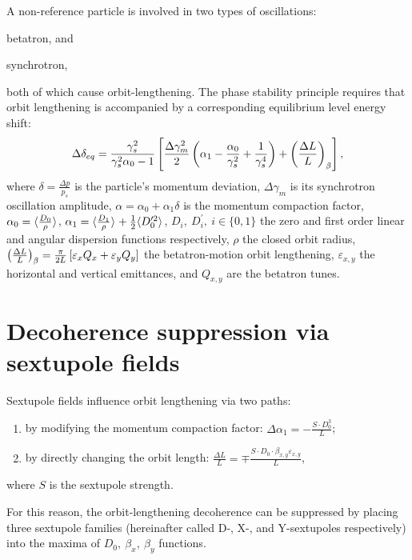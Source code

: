 \documentclass{article}
\begin{document}
A non-reference particle is involved in two types of oscillations:
\begin{inparaenum}[a)]
\item betatron, and
\item synchrotron,
\end{inparaenum}
both of which cause orbit-lengthening. The phase stability principle requires that orbit lengthening is accompanied by a corresponding equilibrium level energy shift:~\cite{Senichev:Decoh}
\begin{equation}
  \Delta\delta_{eq} = \frac{\gamma_s^2}{\gamma_s^2\alpha_0 - 1}\bkt*{\frac{\Delta\gamma_m^2}{2}\bkt{\alpha_1 - \frac{\alpha_0}{\gamma_s^2} + \frac{1}{\gamma_s^4}} + \bkt{\frac{\Delta L}{L}}_\beta},
\end{equation}
where $\delta = \frac{\Delta p}{p_s}$ is the particle's momentum deviation, $\Delta\gamma_m$ is its synchrotron oscillation amplitude, $\alpha = \alpha_0 + \alpha_1\delta$ is the momentum compaction factor, $\alpha_0 = \avg{\frac{D_0}{\rho}}$, $\alpha_1 = \avg{\frac{D_1}{\rho}} + \frac12 \avg{D_0^{\prime2}}$, $D_i,~D_i^\prime,~i\in\{0,1\}$ the zero and first order linear and angular dispersion functions respectively, $\rho$ the closed orbit radius, $\bkt{\frac{\Delta L}{L}}_\beta = \frac{\pi}{2L}\bkt*{\varepsilon_x Q_x + \varepsilon_y Q_y}$ the betatron-motion orbit lengthening, $\varepsilon_{x,y}$ the horizontal and vertical emittances, and $Q_{x,y}$ are the betatron tunes.

\section{Decoherence suppression via sextupole fields}
Sextupole fields influence orbit lengthening via two paths:~\cite{Senichev:Decoh}
\begin{enumerate}
\item by modifying the momentum compaction factor: $\Delta\alpha_1 = -\frac{S\cdot D_0^3}{L}$;
\item by directly changing the orbit length: $\frac{\Delta L}{L} = \mp \frac{S\cdot D_0\cdot \beta_{x,y}\varepsilon_{x,y}}{L}$,
\end{enumerate}
where $S$ is the sextupole strength.

For this reason, the orbit-lengthening decoherence can be suppressed by placing three sextupole families (hereinafter called D-, X-, and Y-sextupoles respectively) into the maxima of $D_0,~\beta_x,~\beta_y$ functions.
\end{document}
